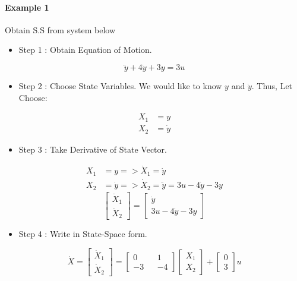 \paragraph{Example 1} Obtain S.S from system below
\begin{itemize}
	\item Step 1 : Obtain Equation of Motion.
\end{itemize}
\[
\ddot{y} + 4 \dot{y} + 3 y = 3 u
\]
\begin{itemize}
	\item Step 2 : Choose State Variables. We would like to know \(y\) and \(\dot{y}\). Thus, Let Choose:
\end{itemize}
\[
\begin{split}
	X_1 &= y \\
	X_2 &= \dot{y}
\end{split}
\]
\begin{itemize}
	\item Step 3 : Take Derivative of State Vector.
\end{itemize}
\[
\begin{split}
	X_1 &= y => \dot{X}_1 = \dot{y}\\
	X_2 &= \dot{y} => \dot{X}_2 = \ddot{y} = 3u - 4 \dot{y} - 3 y
\end{split}
\]
\[
\begin{bmatrix}
	\dot{X}_1 \\
	\dot{X}_2 
\end{bmatrix} =
\begin{bmatrix}
	\dot{y}              \\
	3u - 4 \dot{y} - 3 y 
\end{bmatrix}
\]
\begin{itemize}
	\item Step 4 : Write in State-Space form.
\end{itemize}
\[
\dot{X} = 
\begin{bmatrix}
	\dot{X}_1 \\
	\dot{X}_2 
\end{bmatrix} =
\begin{bmatrix}
	0  &   & 1  \\
	-3 &   & -4 
\end{bmatrix}
\begin{bmatrix}
	X_1 \\
	X_2 
\end{bmatrix} +
\begin{bmatrix}
	0 \\
	3 
\end{bmatrix} u
\]
